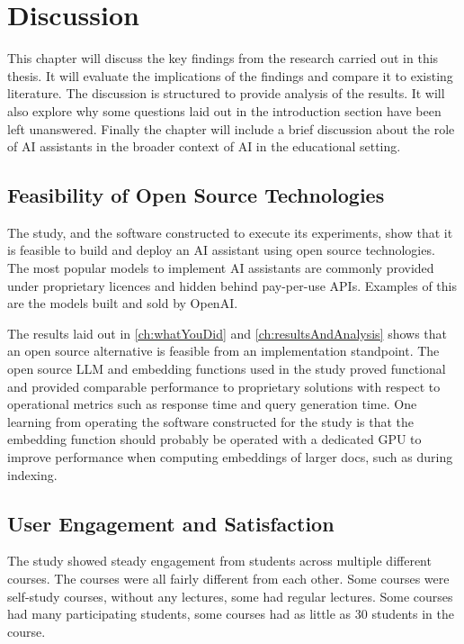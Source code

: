 ﻿\chapter{Discussion}
\label{ch:discussion}


This chapter will discuss the key findings from the research carried out in this thesis. It will evaluate the implications of the findings and compare it to existing literature. The discussion is structured to provide analysis of the results. It will also explore why some questions laid out in the introduction section have been left unanswered. Finally the chapter will include a brief discussion about the role of AI assistants in the broader context of AI in the educational setting.




\section{Feasibility of Open Source Technologies}


The study, and the software constructed to execute its experiments, show that it is feasible to build and deploy an AI assistant using open source technologies. The most popular models to implement AI assistants are commonly provided under proprietary licences and hidden behind pay-per-use APIs. Examples of this are the models built and sold by OpenAI.


The results laid out in \autoref{ch:whatYouDid} and \autoref{ch:resultsAndAnalysis} shows that an open source alternative is feasible from an implementation standpoint. The open source \gls{LLM} and embedding functions used in the study proved functional and provided comparable performance to proprietary solutions with respect to operational metrics such as response time and query generation time. One learning from operating the software constructed for the study is that the embedding function should probably be operated with a dedicated GPU to improve performance when computing embeddings of larger docs, such as during indexing.


\section{User Engagement and Satisfaction}


The study showed steady engagement from students across multiple different courses. The courses were all fairly different from each other. Some courses were self-study courses, without any lectures, some had regular lectures. Some courses had many participating students, some courses had as little as 30 students in the course.



